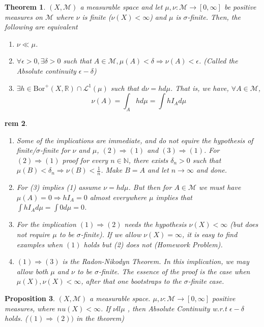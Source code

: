 \documentclass[letterpaper, 12pt]{article}
\newcommand{\fin}{\qquad \quad \hfill \framebox[1.75mm][l]{\,}}
\newcommand{\cL}{\mathcal{L}}
\newcommand{\cM}{\mathcal{M}}
\newcommand{\bR}{\mathbb{R}}
\newcommand{\bN}{\mathbb{N}}
\newcommand{\Bor}{\mathrm{Bor}}
\theoremstyle{stdthm}
\newtheorem{thm}{Theorem}[section]
\newtheorem{prop}[thm]{Proposition}
\theoremstyle{stddef}
\newtheorem{rem}[thm]{rem} %
\theoremstyle{stdnonum}
\theoremstyle{stdqands}
\theoremstyle{stdbold}
\begin{document}
\begin{thm}
$(X,\cM)$ a measurable space and let $\mu,\nu: \cM \rightarrow [0,\infty]$ be positive measures on $\cM$ where $\nu$ is finite ($\nu(X) < \infty$) and $\mu$ is $\sigma$-finite. Then, the following are equivalent
\begin{enumerate}
\item $\nu \ll \mu$. 
\item $\forall \epsilon >0, \exists \delta > 0$ such that $A\in \cM, \mu(A) < \delta \Rightarrow \nu(A) < \epsilon$. (Called the Absolute continuity $\epsilon -\delta$)
\item $\exists h \in \Bor^+(X,\bR) \cap \cL^1(\mu)$ such that $d\nu = h d\mu$. That is, we have, $\forall A \in \cM$,  
\[ \nu(A) = \int_A h d\mu = \int h I_A d\mu \]
\end{enumerate}
\end{thm}

\begin{rem}
\begin{enumerate}
\item Some of the implications are immediate, and do not equire the hypothesis of finite/$\sigma$-finite for $\nu$ and $\mu$, $(2) \Rightarrow (1)$ and $(3) \Rightarrow (1)$. For $(2) \Rightarrow (1)$ proof for every $n \in \bN$, there exists $\delta_n >0$ such that $\mu(B) < \delta_n \Rightarrow  \nu(B) < \frac{1}{n}$. Make $B = A$ and let $n\rightarrow \infty$ and done. 
\item For (3) implies (1) assume $\nu = h d\mu$. But then for $A \in \cM$ we must have $\mu(A) = 0 \Rightarrow h I_A = 0$ almost everywhere $\mu$ implies that $\int hI_A d\mu = \int 0 d\mu = 0$. 
\item For the implication $(1) \Rightarrow (2)$ needs the hypothesis $\nu(X) < \infty$ (but does not require $\mu$ to be $\sigma$-finite). If we allow $\nu(X) = \infty$, it is easy to find examples when $(1)$ holds but (2) does not (Homework Problem). 
\item $(1) \Rightarrow (3)$ is the Radon-Nikodyn Theorem. In this implication, we may allow both $\mu$ and $\nu$ to be $\sigma$-finite. The essence of the proof is the case when $\mu(X), \nu(X) < \infty$, after that one bootstraps to the $\sigma$-finite case. 
\end{enumerate}
\end{rem}



\begin{prop}
$(X,\cM)$ a measurable space. $\mu,\nu: \cM \rightarrow [0,\infty]$ positive measures, where $nu(X) < \infty$. If $\nu ll \mu$ , then Absolute Continuity w.r.t $\epsilon - \delta$ holds. ($(1) \Rightarrow (2))$ in the theorem) 
\end{prop}
\end{document}
